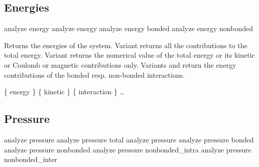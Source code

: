 \subsection{Energies}
\label{analyze:energy}
\begin{pysyntax}
\end{pysyntax}

\begin{essyntax}
   analyze energy
   analyze energy 
   analyze energy bonded 
   analyze energy nonbonded  
\end{essyntax}
Returns the energies of the system. Variant  returns all
the contributions to the total energy. Variant  returns the
numerical value of the total energy or its kinetic or Coulomb or magnetic
contributions only. Variants  and  return the
energy contributions of the bonded resp. non-bonded interactions.

\begin{code}
\{ energy  \} \{ kinetic  \} \{ interaction  \} \dots 
\end{code}

\subsection{Pressure}
\label{analyze:pressure}
\begin{pysyntax}
\end{pysyntax}
\begin{essyntax}
   analyze pressure
   analyze pressure total
   analyze pressure 
   analyze pressure bonded 
   analyze pressure nonbonded  
   analyze pressure nonbonded_intra 
   analyze pressure nonbonded_inter 
\end{essyntax}

